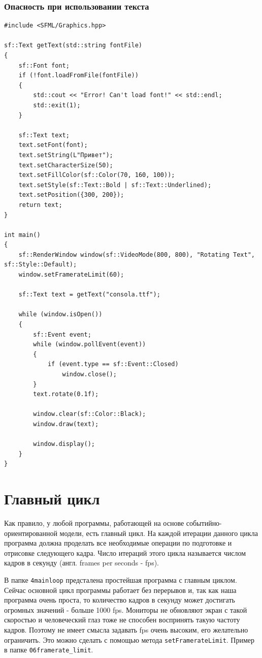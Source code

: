 \documentclass{article}
\begin{document}
\newpage
\subsubsection*{Опасность при использовании текста}
\begin{lstlisting}
#include <SFML/Graphics.hpp>

sf::Text getText(std::string fontFile)
{
	sf::Font font;
    if (!font.loadFromFile(fontFile))
    {
        std::cout << "Error! Can't load font!" << std::endl;
        std::exit(1);
    }
    
    sf::Text text;
    text.setFont(font);
    text.setString(L"Привет");
    text.setCharacterSize(50);
    text.setFillColor(sf::Color(70, 160, 100));
    text.setStyle(sf::Text::Bold | sf::Text::Underlined);
    text.setPosition({300, 200});
    return text;
}

int main()
{
    sf::RenderWindow window(sf::VideoMode(800, 800), "Rotating Text", sf::Style::Default);
    window.setFramerateLimit(60);
    
    sf::Text text = getText("consola.ttf");

    while (window.isOpen())
    {
        sf::Event event;
        while (window.pollEvent(event)) 
        {
            if (event.type == sf::Event::Closed)
                window.close();
        }
        text.rotate(0.1f);

        window.clear(sf::Color::Black);
        window.draw(text);

        window.display();
    }
}
\end{lstlisting}


\newpage
\section{Главный цикл}
Как правило, у любой программы, работающей на основе событийно-ориентированной модели, есть главный цикл. На каждой итерации данного цикла программа должна проделать все необходимые операции по подготовке и отрисовке следующего кадра. Число итераций этого цикла называется числом кадров в секунду (англ. frames per seconds - fps).

В папке \texttt{4mainloop} предсталена простейшая программа с главным циклом. Сейчас основной цикл программы работает без перерывов и, так как наша программа очень проста, то количество кадров в секунду может достигать огромных значений - больше 1000 fps. Мониторы не обновляют экран с такой скоростью и человеческий глаз тоже не способен воспринять такую частоту кадров. Поэтому не имеет смысла задавать fps очень высоким, его желательно ограничить. Это можно сделать с помощью метода \texttt{setFramerateLimit}. Пример в папке \texttt{06framerate\_limit}.
\end{document}

